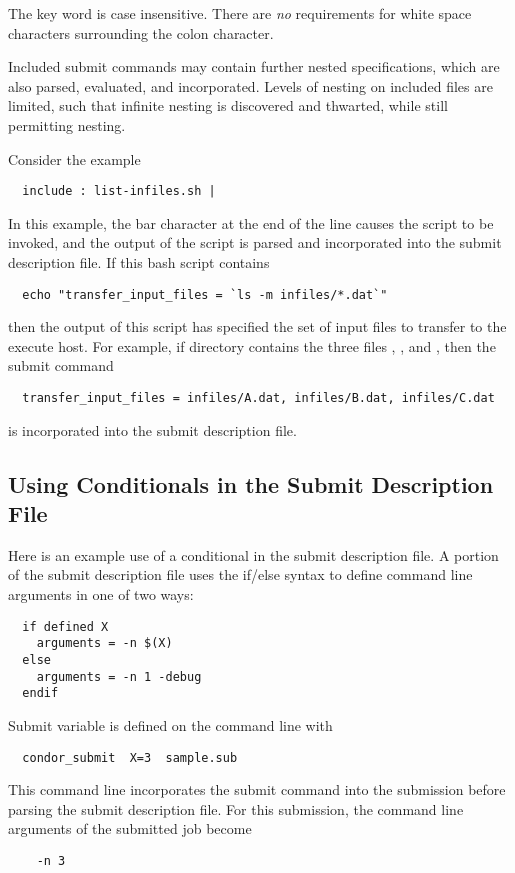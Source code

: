 The  key word is case insensitive.
There are \emph{no} requirements for white space characters surrounding
the colon character.

Included submit commands may contain further nested  
specifications, 
which are also parsed, evaluated, and incorporated.
Levels of nesting on included files are limited,
such that infinite nesting is discovered and thwarted,
while still permitting nesting.

Consider the example
\begin{verbatim}
  include : list-infiles.sh |
\end{verbatim}
In this example, the bar character at the end of the line 
causes the script  to be invoked,
and the output of the script is parsed and incorporated into
the submit description file.
If this bash script contains
\footnotesize
\begin{verbatim}
  echo "transfer_input_files = `ls -m infiles/*.dat`"
\end{verbatim}
\normalsize
then the output of this script has specified the set of
input files to transfer to the execute host. 
For example,
if directory  contains the three files
,
, and
,
then the submit command
\footnotesize
\begin{verbatim}
  transfer_input_files = infiles/A.dat, infiles/B.dat, infiles/C.dat
\end{verbatim}
\normalsize
is incorporated into the submit description file.

\subsection{\label{sec:user-man-ifelse}Using Conditionals in the Submit Description File}


Here is an example use of a conditional in the submit description file.
A portion of the  submit description file uses
the if/else syntax to define command line arguments in one of two ways:
\begin{verbatim}
  if defined X
    arguments = -n $(X)
  else
    arguments = -n 1 -debug
  endif
\end{verbatim}

Submit variable  is defined on the  command line with
\begin{verbatim}
  condor_submit  X=3  sample.sub
\end{verbatim}
This command line incorporates the submit command 
into the submission before parsing the submit description file.
For this submission, the command line arguments of the submitted
job become
\begin{verbatim}
    -n 3
\end{verbatim}

